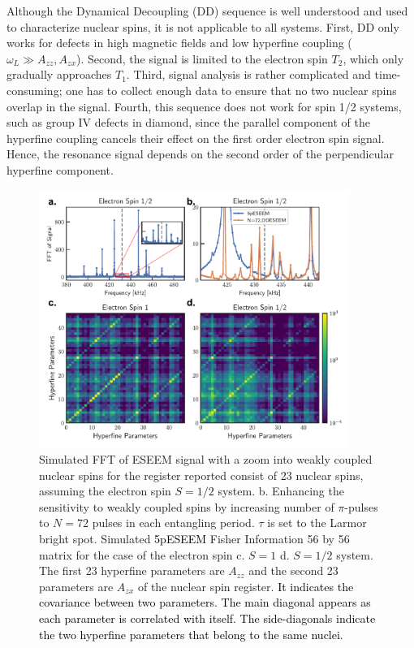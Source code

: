\documentclass[%
 reprint,
superscriptaddress,
 amsmath,amssymb,
 aps,
]{revtex4-2}
\begin{document}
Although the Dynamical Decoupling (DD) sequence is well understood and used to characterize nuclear spins, it is not applicable to all systems.
First, DD only works for defects in high magnetic fields and low hyperfine coupling ($\omega_L \gg A_{zz}, A_{zx}$).
Second, the signal is limited to the electron spin $T_2$, which only gradually approaches $T_1$.
Third, signal analysis is rather complicated and time-consuming; one has to collect enough data to ensure that no two nuclear spins overlap in the signal.
Fourth, this sequence does not work for spin 1/2 systems, such as group IV defects in diamond, since the parallel component of the hyperfine coupling cancels their effect on the first order electron spin signal.
Hence, the resonance signal depends on the second order of the perpendicular hyperfine component.
\begin{figure}[htbp]
	\begin{center}
		\includegraphics[width=0.9\textwidth]{figure_2.pdf}
		\caption{Simulated FFT of ESEEM signal with a zoom into weakly coupled nuclear spins for the register reported \cite{abobeih2019atomic} consist of 23 nuclear spins, assuming the electron spin $S=1/2$ system. b. Enhancing the sensitivity to weakly coupled spins by increasing number of $\pi$-pulses to $N=72$ pulses in each entangling period. $\tau$ is set to the Larmor bright spot. Simulated  \textcolor{black}{5pESEEM} Fisher Information 56 by 56 matrix for the case of the electron spin c. $S=1$ d. $S=1/2$ system. The first 23 hyperfine parameters are $A_{zz}$ and the second 23 parameters are $A_{zx}$ of the nuclear spin register. \textcolor{black}{It indicates the covariance between two parameters. The main diagonal appears as each parameter is correlated with itself. The side-diagonals indicate the two hyperfine parameters that belong to the same nuclei.}}
		\label{fig:ddeseem}
	\end{center}
\end{figure}
\end{document}
